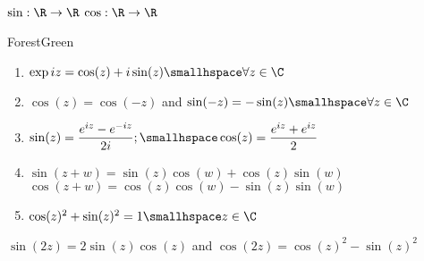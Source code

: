 \newsectionNoPB
\subsection{}
\shorttheorem $\sin: \R \rightarrow \R$ \trand $\cos: \R \rightarrow \R$ 
\shorttheorem
\begin{simplebox}[]{ForestGreen}
    \begin{multicols}{2}
        \begin{enumerate}
            \item $\exp iz = \cos(z) + i \sin(z) \smallhspace \forall z \in \C$
            \item $\cos(z) = \cos(-z)$ and $\sin(-z) = - \sin(z) \smallhspace \forall z \in \C$
            \item $\displaystyle \sin(z) = \frac{e^{iz} - e^{-iz}}{2i}; \smallhspace \cos(z) = \frac{e^{iz} + e^{iz}}{2}$
            \item $\sin(z + w) = \sin(z) \cos(w) + \cos(z) \sin(w)$\\
                  $\cos(z + w) = \cos(z) \cos(w) - \sin(z) \sin(w)$
            \item $\cos(z)^2 + \sin(z)^2 = 1 \smallhspace z \in \C$
        \end{enumerate}
    \end{multicols}
\end{simplebox}
\shortcorollary $\sin(2z) = 2 \sin(z) \cos(z)$ and $\cos(2z) = \cos(z)^2 - \sin(z)^2$


\newsectionNoPB
